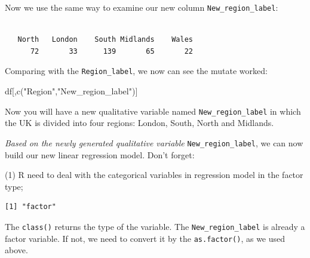 \documentclass[
  letterpaper,
  DIV=11,
  numbers=noendperiod]{scrreprt}
\newenvironment{Shaded}{\begin{snugshade}}{\end{snugshade}}
\newcommand{\FunctionTok}[1]{\textcolor[rgb]{0.28,0.35,0.67}{#1}}
\newcommand{\NormalTok}[1]{\textcolor[rgb]{0.00,0.23,0.31}{#1}}
\newcommand{\OtherTok}[1]{\textcolor[rgb]{0.00,0.23,0.31}{#1}}
\newcommand{\SpecialCharTok}[1]{\textcolor[rgb]{0.37,0.37,0.37}{#1}}
\newcommand{\StringTok}[1]{\textcolor[rgb]{0.13,0.47,0.30}{#1}}
\begin{document}
Now we use the same way to examine our new column
\texttt{New\_region\_label}:

\begin{Shaded}
\end{Shaded}

\begin{verbatim}

   North   London    South Midlands    Wales 
      72       33      139       65       22 
\end{verbatim}

Comparing with the \texttt{Region\_label}, we now can see the mutate
worked:

\begin{Shaded}
\begin{Highlighting}[]
\NormalTok{df[,}\FunctionTok{c}\NormalTok{(}\StringTok{"Region"}\NormalTok{,}\StringTok{"New\_region\_label"}\NormalTok{)]}
\end{Highlighting}
\end{Shaded}

Now you will have a new qualitative variable named
\texttt{New\_region\_label} in which the UK is divided into four
regions: London, South, North and Midlands.

\emph{Based on the newly generated qualitative variable}
\texttt{New\_region\_label}, we can now build our new linear regression
model. Don't forget:

(1) R need to deal with the categorical variables in regression model in
the factor type;

\begin{Shaded}
\end{Shaded}

\begin{verbatim}
[1] "factor"
\end{verbatim}

The \texttt{class()} returns the type of the variable. The
\texttt{New\_region\_label} is already a factor variable. If not, we
need to convert it by the \texttt{as.factor()}, as we used above.

\begin{Shaded}
\end{Shaded}
\end{document}
